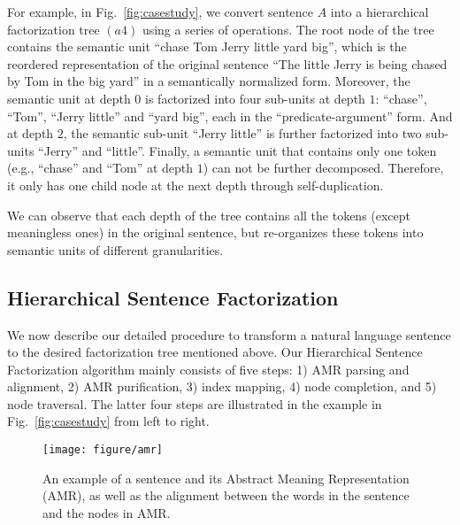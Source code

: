 For example, in Fig.~\ref{fig:casestudy}, we convert sentence $A$ into a hierarchical factorization tree $(a4)$ using a series of operations. The root node of the tree contains the semantic unit ``chase Tom Jerry little yard big'', which is the reordered representation of the original sentence ``The little Jerry is being chased by Tom in the big yard'' in a semantically normalized form. 
Moreover, the semantic unit at depth $0$ is factorized into four sub-units at depth $1$: ``chase'', ``Tom'', ``Jerry little'' and ``yard big'', each in the ``predicate-argument'' form. And at depth $2$, the semantic sub-unit ``Jerry little'' is further factorized into two sub-units ``Jerry'' and ``little''. Finally, a semantic unit that contains only one token (e.g., ``chase'' and ``Tom'' at depth $1$) can not be further decomposed. Therefore, it only has one child node at the next depth through self-duplication.

We can observe that each depth of the tree contains all the tokens (except meaningless ones) in the original sentence, but re-organizes these tokens into semantic units of different granularities. %



\subsection{Hierarchical Sentence Factorization}
\label{subsec:sf}

We now describe our detailed procedure to transform a natural language sentence to the desired factorization tree mentioned above.
Our Hierarchical Sentence Factorization algorithm mainly consists of five steps: 1) AMR parsing and alignment, 2) AMR purification, 3) index mapping, 4) node completion, and 5) node traversal. The latter four steps are illustrated in the example in Fig.~\ref{fig:casestudy} from left to right.%


\begin{figure}[tb]
\centering
\texttt{[image: figure/amr]}
\vspace{0mm}
\caption{An example of a sentence and its Abstract Meaning Representation (AMR), as well as the alignment between the words in the sentence and the nodes in AMR.}
\label{fig:amr}
\vspace{-3mm}
\end{figure}


